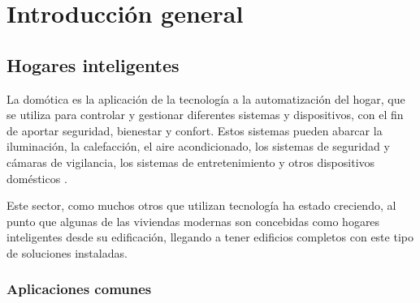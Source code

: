 
\chapter{Introducción general} %

\label{Chapter1} %
\label{IntroGeneral}


\newcommand{\keyword}[1]{\textbf{#1}}
\newcommand{\tabhead}[1]{\textbf{#1}}
\newcommand{\code}[1]{\texttt{#1}}
\newcommand{\file}[1]{\texttt{\bfseries#1}}
\newcommand{\option}[1]{\texttt{\itshape#1}}
\newcommand{\grados}{$^{\circ}$}



\section{Hogares inteligentes}

La domótica es la aplicación de la tecnología a la automatización del hogar, que se utiliza para controlar y gestionar diferentes sistemas y dispositivos, con el fin de aportar seguridad, bienestar y confort. Estos sistemas pueden abarcar la iluminación, la calefacción, el aire acondicionado, los sistemas de seguridad y cámaras de vigilancia, los sistemas de entretenimiento y otros dispositivos domésticos \citep{1}.

Este sector, como muchos otros que utilizan tecnología ha estado creciendo, al punto que algunas de las viviendas modernas son concebidas como hogares inteligentes desde su edificación, llegando a tener edificios completos con este tipo de soluciones instaladas.

\subsection{Aplicaciones comunes}

